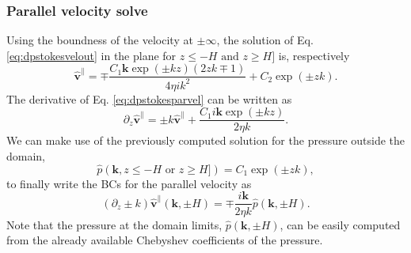 \documentclass[twoside,openright,titlepage,numbers=noenddot,%
headinclude,footinclude,cleardoublepage=empty,abstract=on,
BCOR=5mm,fontsize=11pt, dvipsnames, paper=b5
]{scrreprt}
\renewcommand{\vec}[1]{\bm{#1}}
\newcommand{\fou}[1]{\widehat{#1}}
\newcommand{\fvel}{v}
\begin{document}
\subsubsection*{Parallel velocity solve}
Using the boundness of the velocity at $\pm\infty$, the solution of Eq. \eqref{eq:dpstokesvelout} in the plane for $z \le -H \text{ and } z\ge H]$ is, respectively
\begin{equation}
  \label{eq:dpstokesparvel}
  \fou{\vec{\fvel}}^{\parallel} = \mp\frac{C_1\vec{k}\exp(\pm kz)\left(2zk\mp 1\right)}{4\eta ik^2} + C_2\exp(\pm zk).
\end{equation}
The derivative of Eq. \eqref{eq:dpstokesparvel} can be written as
\begin{equation}
  \label{eq:dpstokesparvelder}
  \partial_z\fou{\vec{\fvel}}^{\parallel} = \pm k\fou{\vec{\fvel}}^{\parallel} + \frac{C_1i\vec{k}\exp(\pm kz)}{2\eta k}.
\end{equation}
We can make use of the previously computed solution for the pressure outside the domain,
\begin{equation}
  \label{eq:dpstokespresout}
\fou{p}(\vec{k}, z \le -H \text{ or } z\ge H]) = C_1\exp\left(\pm zk\right),
\end{equation}
to finally write the \glspl{BC} for the parallel velocity as
\begin{equation}
  \label{eq:dpstokesparvelbc}
  \left(\partial_z\pm k\right)\fou{\vec{\fvel}}^\parallel(\vec{k}, \pm H) = \mp \frac{i\vec{k}}{2\eta k}\fou{p}(\vec{k}, \pm H).
\end{equation}
Note that the pressure at the domain limits, $\fou{p}(\vec{k}, \pm H)$, can be easily computed from the already available Chebyshev coefficients of the pressure.
\end{document}
